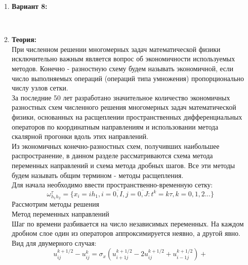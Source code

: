 \documentclass[12pt]{article}
\begin{document}
\begin{enumerate}
        \item \textbf{Вариант 8:}\\
        \begin{figure}[h]
            \label{ris:image}
        \end{figure}\\
        \item \textbf{Теория:}\\
         При численном решении многомерных задач математической физики
        исключительно важным является вопрос об экономичности используемых
        методов. Конечно - разностную схему будем называть экономичной, если
        число выполняемых операций (операций типа умножения) пропорционально
        числу узлов сетки. 
        \\За последние 50 лет разработано значительное количество
        экономичных разностных схем численного решения многомерных задач
        математической физики, основанных на расщеплении пространственных
        дифференциальных операторов по координатным направлениям и
        использовании метода скалярной прогонки вдоль этих направлений. 
        \\Из экономичных конечно-разностных схем, получивших наибольшее
        распространение, в данном разделе рассматриваются схема метода
        переменных направлений и схема метода дробных шагов. Все эти методы
        будем называть общим термином - методы расщепления.
        \\Для начала необходимо ввести пространственно-временную сетку:
        $$\omega^{\tau}_{h_1h_2} = \{ x_i = ih_1, i=\overline{0,I}, j=\overline{0,J} : 
        t^k = k\tau, k = 0,1,2...\} $$
        Рассмотрим методы решения
        \\Метод переменных направлений
        \\Шаг по времени разбивается на число независимых переменных. На каждом 
        дробном слое один из операторов аппроксимируется неявно, а другой 
        явно. Вид для двумерного случая:
        $$u^{k+1/2}_{ij} - u^k_{ij}= \sigma_x(u^{k+1/2}_{i+1 j}-2u^{k+1/2}_{i j} +u^{k+1/2}_{i-1 j})+
$$
\end{enumerate}
\end{document}
